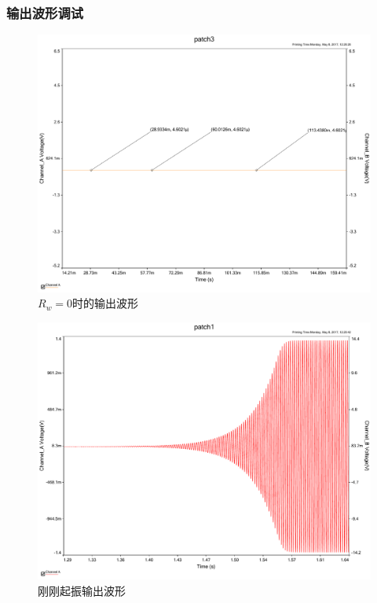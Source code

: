 \documentclass[UTF8,a4paper]{paper}
\begin{document}
\subsubsection{输出波形调试}
\begin {figure}
\includegraphics [width=\textwidth]{0ac.pdf}
\caption{$R_w=0$时的输出波形}
\label{AC0}
\end {figure}
\begin {figure}
\centering
\includegraphics [width=\textwidth]{startac.pdf}
\caption{刚刚起振输出波形}
\label{ACstart}
\end {figure}
\end{document}

